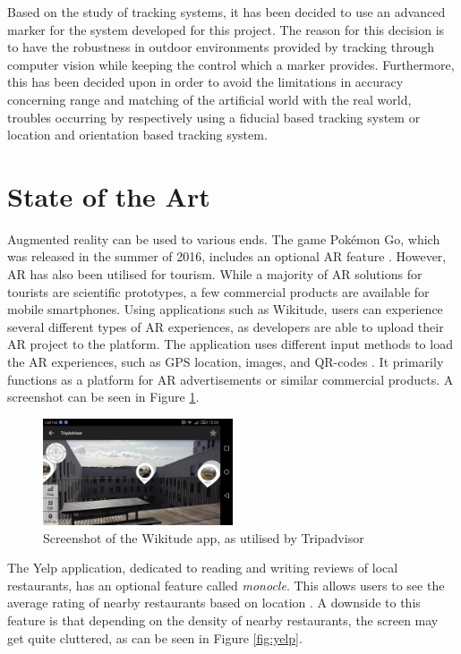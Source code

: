 Based on the study of tracking systems, it has been decided to use an advanced marker for the system developed for this project. The reason for this decision is to have the robustness in outdoor environments provided by tracking through computer vision while keeping the control which a marker provides. Furthermore, this has been decided upon in order to avoid the limitations in accuracy concerning range and matching of the artificial world with the real world, troubles occurring by respectively using a fiducial based tracking system or location and orientation based tracking system.

\section{State of the Art}
Augmented reality can be used to various ends. The game Pokémon Go, which was released in the summer of 2016, includes an optional AR feature \cite{Pokemon}. However, AR has also been utilised for tourism. While a majority of AR solutions for tourists are scientific prototypes, a few commercial products are available for mobile smartphones. Using applications such as Wikitude, users can experience several different types of AR experiences, as developers are able to upload their AR project to the platform. The application uses different input methods to load the AR experiences, such as GPS location, images, and QR-codes \cite{Wikitude}. It primarily functions as a platform for AR advertisements or similar commercial products. A screenshot can be seen in Figure \ref{fig:wikitude}.

\begin{figure}[h!]
    \centering
    \includegraphics[width=0.5\textwidth]{figures/wikitude.png}
    \caption{Screenshot of the Wikitude app, as utilised by Tripadvisor}\label{fig:wikitude}
\end{figure}

The Yelp application, dedicated to reading and writing reviews of local restaurants, has an optional feature called \textit{monocle}. This allows users to see the average rating of nearby restaurants based on location \cite{Yelp}. A downside to this feature is that depending on the density of nearby restaurants, the screen may get quite cluttered, as can be seen in Figure \ref{fig:yelp}.

